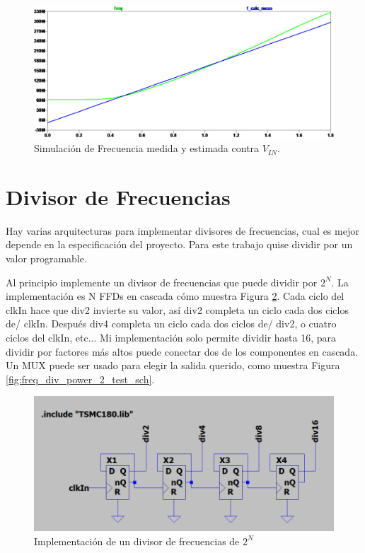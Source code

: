 \documentclass[a4paper]{article}
\begin{document}
\begin{figure}[!htb]
\centering
\includegraphics[scale=0.4]{./img/vco7_sim}
\caption{Simulación de Frecuencia medida y estimada contra $V_{IN}$.}
\label{fig:vco7_sim}
\end{figure}

\section{Divisor de Frecuencias}

Hay varias arquitecturas para implementar divisores de frecuencias, cual es mejor depende en la especificación del proyecto. Para este trabajo quise dividir por un valor programable.

Al principio implemente un divisor de frecuencias que puede dividir por $2^N$. La implementación es N FFDs en cascada cómo muestra Figura \ref{fig:freq_div_power_2_sch}. Cada ciclo del clkIn hace que div2 invierte su valor, así div2 completa un ciclo cada dos ciclos de/ clkIn. Después div4 completa un ciclo cada dos ciclos de/ div2, o cuatro ciclos del clkIn, etc... Mi implementación solo permite dividir hasta 16, para dividir por factores más altos puede conectar dos de los componentes en cascada. Un MUX puede ser usado para elegir la salida querido, como muestra Figura \ref{fig:freq_div_power_2_test_sch}.

\begin{figure}[!htb]
\centering
\includegraphics[scale=0.4]{./img/freq_div_power_2_sch}
\caption{Implementación de un divisor de frecuencias de $2^N$ }
\label{fig:freq_div_power_2_sch}
\end{figure}
\end{document}
